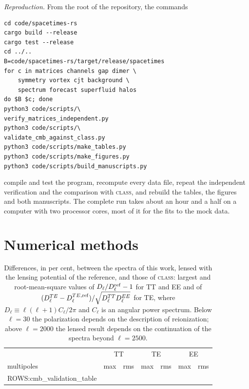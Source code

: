\emph{Reproduction.} From the root of the repository, the commands
\begin{verbatim}
cd code/spacetimes-rs
cargo build --release
cargo test --release
cd ../..
B=code/spacetimes-rs/target/release/spacetimes
for c in matrices channels gap dimer \
    symmetry vortex cjt background \
    spectrum forecast superfluid halos
do $B $c; done
python3 code/scripts/\
verify_matrices_independent.py
python3 code/scripts/\
validate_cmb_against_class.py
python3 code/scripts/make_tables.py
python3 code/scripts/make_figures.py
python3 code/scripts/build_manuscripts.py
\end{verbatim}
compile and test the program, recompute every data file, repeat the independent verification and
the comparison with \textsc{class}, and rebuild the tables, the figures and both manuscripts. The complete run takes about an hour and a
half on a computer with two processor cores, most of it for the fits to the mock data.

\section{Numerical methods}
\label{app:num}

\begin{table}
\caption{\label{tab:cmbval}Differences, in per cent, between the spectra of this work, lensed with the
lensing potential of the reference, and those of \textsc{class}: largest and root-mean-square values
of $D_\ell/D_\ell^{\rm ref}-1$ for TT and EE and of
$(D_\ell^{TE}-D_\ell^{TE,\rm ref})/\sqrt{D_\ell^{TT}D_\ell^{EE}}$ for TE, where
$D_\ell\equiv\ell(\ell+1)C_\ell/2\pi$ and $C_\ell$ is an angular power spectrum. Below $\ell=30$ the
polarization depends on the description of reionization; above $\ell=2000$ the lensed result depends
on the continuation of the spectra beyond $\ell=2500$.}
\begin{ruledtabular}
\begin{tabular}{lcccccc}
 & \multicolumn{2}{c}{TT} & \multicolumn{2}{c}{TE} & \multicolumn{2}{c}{EE} \\
multipoles & max & rms & max & rms & max & rms \\
\hline
{{ROWS:cmb_validation_table}}
\end{tabular}
\end{ruledtabular}
\end{table}

